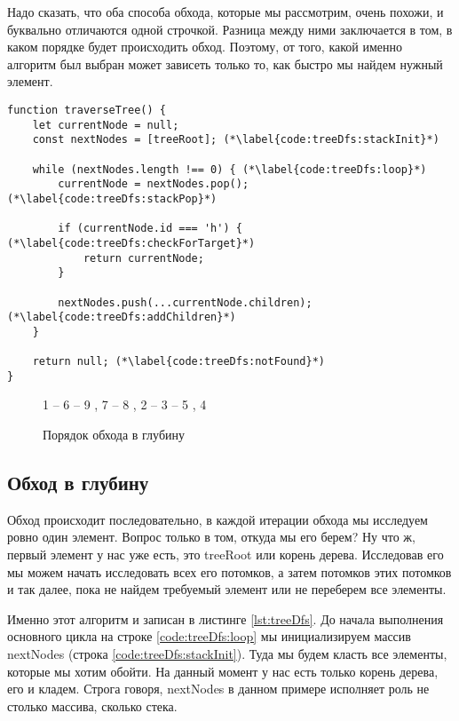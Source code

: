 \documentclass[../../article]{subfiles}
\begin{document}
Надо сказать, что оба способа обхода, которые мы рассмотрим, очень похожи, и буквально отличаются одной строчкой. Разница между ними заключается в том, в каком порядке будет происходить обход. Поэтому, от того, какой именно алгоритм был выбран может зависеть только то, как быстро мы найдем нужный элемент.

\begin{figure*}
    \begin{ruledelement}
        \begin{lstlisting}[caption={Обход дерева в глубину}, label={lst:treeDfs}]
function traverseTree() {
    let currentNode = null;
    const nextNodes = [treeRoot]; (*\label{code:treeDfs:stackInit}*)

    while (nextNodes.length !== 0) { (*\label{code:treeDfs:loop}*)
        currentNode = nextNodes.pop(); (*\label{code:treeDfs:stackPop}*)

        if (currentNode.id === 'h') { (*\label{code:treeDfs:checkForTarget}*)
            return currentNode;
        }

        nextNodes.push(...currentNode.children); (*\label{code:treeDfs:addChildren}*)
    }

    return null; (*\label{code:treeDfs:notFound}*)
}
        \end{lstlisting}
    \end{ruledelement}
\end{figure*}

\begin{figure}
    \styledgraph
    {
        1 -- { 6 -- { 9 , 7 -- 8 }, 2 -- 3 -- { 5 , 4 }}
    }
    \caption{Порядок обхода в глубину}
    \label{fig:treeDfsOrder}
\end{figure}

\subsection{Обход в глубину}

Обход происходит последовательно, в каждой итерации обхода мы исследуем ровно один элемент. Вопрос только в том, откуда мы его берем? Ну что ж, первый элемент у нас уже есть, это {\firacodebold treeRoot} или корень дерева. Исследовав его мы можем начать исследовать всех его потомков, а затем потомков этих потомков и так далее, пока не найдем требуемый элемент или не переберем все элементы.

Именно этот алгоритм и записан в листинге \ref{lst:treeDfs}. До начала выполнения основного цикла на строке \ref{code:treeDfs:loop} мы инициализируем массив {\firacodebold nextNodes} (строка \ref{code:treeDfs:stackInit}). Туда мы будем класть все элементы, которые мы хотим обойти. На данный момент у нас есть только корень дерева, его и кладем. Строга говоря, {\firacodebold nextNodes} в данном примере исполняет роль не столько массива, сколько {\firacodebold стека}.
\end{document}
